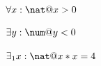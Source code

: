 \documentclass[a4paper,10pt,fleqn]{article}
\begin{document}
\noindent
$\forall x : \nat @ x > 0$


\noindent
$\exists y : \num @ y < 0$


\noindent
$\exists_1 x : \nat @ x * x = 4$
\end{document}
